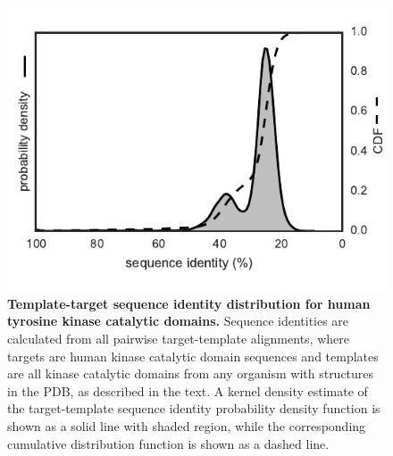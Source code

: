 \documentclass[aps,pre,twocolumn,nofootinbib,superscriptaddress,linenumbers]{revtex4-1}
\begin{document}

\begin{figure}[tb]
    \includegraphics[width=1.0\columnwidth]{seqid_dist/seqid_dist.pdf}

    \caption{{\bf Template-target sequence identity distribution for human tyrosine kinase catalytic domains.}
    Sequence identities are calculated from all pairwise target-template alignments, where targets are human kinase catalytic domain sequences and templates are all kinase catalytic domains from any organism with structures in the PDB, as described in the text.
    A kernel density estimate of the target-template sequence identity probability density function is shown as a solid line with shaded region, while the corresponding cumulative distribution function is shown as a dashed line.
    }
  \label{figure:sequence-identity-distribution}
\end{figure}

\end{document}
